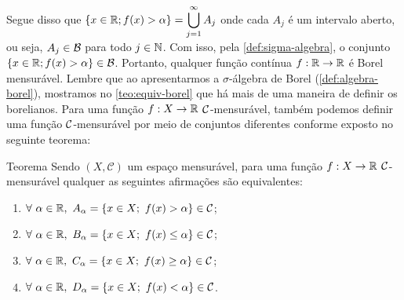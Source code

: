 	Segue disso que
	$\{x \in \mathbb{R}; f(x) > \alpha\} = \displaystyle \bigcup_{j = 1}^\infty A_j$ onde cada $A_j$ é um intervalo aberto, ou seja, $A_j \in \operatorname{\mathcal{B}}$ para todo $j \in \operatorname{\mathbb{N}}$.
	Com isso, pela \ref{def:sigma-algebra}, o conjunto $\{x \in \mathbb{R}; f(x) > \alpha\} \in \operatorname{\mathcal{B}}$.
	Portanto, qualquer função contínua $f: \mathbb{R} \to \mathbb{R}$ é Borel mensurável.
    Lembre que ao apresentarmos a $\sigma$-álgebra de Borel (\ref{def:algebra-borel}), mostramos no \ref{teo:equiv-borel} que há mais de uma maneira de definir os borelianos.
    Para uma função $f: X \to \mathbb{R}$ $\operatorname{\mathcal{C}}$-mensurável, também podemos definir uma função $\operatorname{\mathcal{C}}$-mensurável por meio de conjuntos diferentes conforme exposto no seguinte teorema:
\begin{env}{Teorema}
\label{teo:equiv-funcoes-mensuraveis}
    Sendo $(X,\mathcal{C})$ um espaço mensurável, para uma função $f: X \to \mathbb{R}$ $\operatorname{\mathcal{C}}$-mensurável qualquer as seguintes afirmações são equivalentes:
    \vspace{-0.4cm}
    \begin{multicols}{2}    	
	    \begin{enumerate}[label=(\alph*)]
	        \item $\forall \ \alpha \in \mathbb{R}, \ A_\alpha =\{x \in X;\ f(x) > \alpha \} \in \mathcal{C}$;
	        \item $\forall \ \alpha \in \mathbb{R}, \ B_\alpha =\{x \in X;\ f(x) \leq \alpha \} \in \mathcal{C}$;
	        \item $\forall \ \alpha \in \mathbb{R}, \ C_\alpha =\{x \in X;\ f(x) \geq \alpha \} \in \mathcal{C}$;
	        \item $\forall \ \alpha \in \mathbb{R}, \ D_\alpha =\{x \in X;\ f(x) < \alpha \} \in \mathcal{C}$.
	    \end{enumerate}
     \end{multicols}
	\vspace{-0.2cm}
\end{env}
